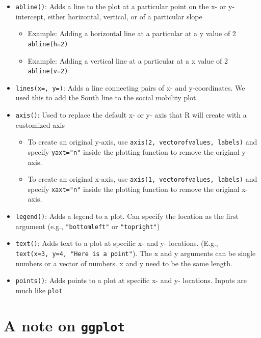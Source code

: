 \documentclass[
  letterpaper,
  DIV=11,
  numbers=noendperiod]{scrreprt}
\providecommand{\tightlist}{%
  \setlength{\itemsep}{0pt}\setlength{\parskip}{0pt}}\usepackage{longtable,booktabs,array}
\begin{document}
\begin{itemize}
\tightlist
\item
  \texttt{abline()}: Adds a line to the plot at a particular point on
  the x- or y- intercept, either horizontal, vertical, or of a
  particular slope

  \begin{itemize}
  \tightlist
  \item
    Example: Adding a horizontal line at a particular at a y value of 2
    \texttt{abline(h=2)}
  \item
    Example: Adding a vertical line at a particular at a x value of 2
    \texttt{abline(v=2)}
  \end{itemize}
\item
  \texttt{lines(x=,\ y=)}: Adds a line connecting pairs of x- and
  y-coordinates. We used this to add the South line to the social
  mobility plot.
\item
  \texttt{axis()}: Used to replace the default x- or y- axis that R will
  create with a customized axis

  \begin{itemize}
  \tightlist
  \item
    To create an original y-axis, use
    \texttt{axis(2,\ vectorofvalues,\ labels)} and specify
    \texttt{yaxt="n"} inside the plotting function to remove the
    original y-axis.
  \item
    To create an original x-axis, use
    \texttt{axis(1,\ vectorofvalues,\ labels)} and specify
    \texttt{xaxt="n"} inside the plotting function to remove the
    original x-axis.
  \end{itemize}
\item
  \texttt{legend()}: Adds a legend to a plot. Can specify the location
  as the first argument (e.g., \texttt{"bottomleft"} or
  \texttt{"topright"})
\item
  \texttt{text()}: Adds text to a plot at specific x- and y- locations.
  (E.g., \texttt{text(x=3,\ y=4,\ "Here\ is\ a\ point"}). The x and y
  arguments can be single numbers or a vector of numbers. x and y need
  to be the same length.
\item
  \texttt{points()}: Adds points to a plot at specific x- and y-
  locations. Inputs are much like \texttt{plot}
\end{itemize}

\hypertarget{a-note-on-ggplot}{%
\section{\texorpdfstring{A note on
\texttt{ggplot}}{A note on ggplot}}\label{a-note-on-ggplot}}
\end{document}
